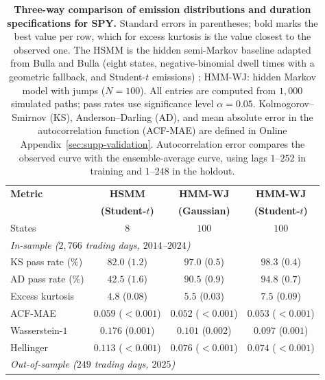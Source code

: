 \begin{table}[H]
\centering
\caption{\textbf{Three-way comparison of emission distributions and
    duration specifications for SPY.} Standard
    errors in parentheses; bold marks the best value per row, which for
    excess kurtosis is the value closest to the observed one. The HSMM
    is the hidden semi-Markov baseline adapted from Bulla and Bulla
    (eight states, negative-binomial dwell times with a geometric
    fallback, and Student-$t$ emissions) \cite{bullaBulla2006}; HMM-WJ:
    hidden Markov model with jumps
    ($N = 100$). All entries are computed from $1{,}000$ simulated
    paths; pass rates use significance level $\alpha = 0.05$. Kolmogorov--Smirnov
    (KS), Anderson--Darling (AD), and mean absolute error in the
    autocorrelation function (ACF-MAE) are defined in
    Online Appendix~\ref{sec:supp-validation}. Autocorrelation error
    compares the observed curve with the ensemble-average curve,
    using lags $1$--$252$ in training and $1$--$248$ in the holdout.}
\label{tab:emission_hsmm}
\small
\begin{tabular}{@{}lccc@{}}
\toprule
\textbf{Metric} & \textbf{HSMM} & \textbf{HMM-WJ} & \textbf{HMM-WJ} \\
                & \textbf{(Student-$t$)} & \textbf{(Gaussian)} & \textbf{(Student-$t$)} \\ \midrule
States              & $8$ & $100$ & $100$ \\[4pt]
\multicolumn{4}{l}{\textit{In-sample ($2{,}766$ trading days, $2014$--$2024$)}} \\[2pt]
KS pass rate (\%)   &  $82.0$ ($1.2$)         &  $97.0$ ($0.5$)         & $\mathbf{98.3}$ ($0.4$) \\
AD pass rate (\%)   &  $42.5$ ($1.6$)         &  $90.5$ ($0.9$)         & $\mathbf{94.8}$ ($0.7$) \\
Excess kurtosis     &   $4.8$ ($0.08$)        &   $5.5$ ($0.03$)        & $\mathbf{7.5}$ ($0.09$) \\
ACF-MAE             & $0.059$ ($<\!0.001$)    & $\mathbf{0.052}$ ($<\!0.001$) & $0.053$ ($<\!0.001$) \\
Wasserstein-$1$     & $0.176$ ($0.001$)       & $0.101$ ($0.002$)       & $\mathbf{0.097}$ ($0.001$) \\
Hellinger           & $0.113$ ($<\!0.001$)    & $0.076$ ($<\!0.001$)   & $\mathbf{0.074}$ ($<\!0.001$) \\[4pt]
\multicolumn{4}{l}{\textit{Out-of-sample ($249$ trading days, $2025$)}} \\[2pt]

\end{tabular}
\end{table}
